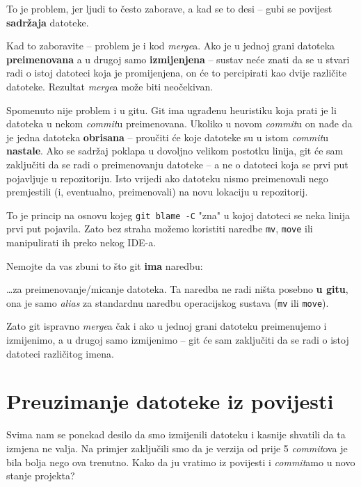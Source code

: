 To je problem, jer ljudi to često zaborave, a kad se to desi -- gubi se povijest \textbf{sadržaja} datoteke.

Kad to zaboravite -- problem je i kod \emph{merge}a.
Ako je u jednoj grani datoteka \textbf{preimenovana} a u drugoj samo \textbf{izmijenjena} -- sustav neće znati da se u stvari radi o istoj datoteci koja je promijenjena, on će to percipirati kao dvije različite datoteke.
Rezultat \emph{merge}a može biti neočekivan.

Spomenuto nije problem i u gitu.
Git ima ugrađenu heuristiku koja prati je li datoteka u nekom \emph{commit}u preimenovana.
Ukoliko u novom \emph{commit}u on nađe da je jedna datoteka \textbf{obrisana} -- proučiti će koje datoteke su u istom \emph{commit}u \textbf{nastale}. 
Ako se sadržaj poklapa u dovoljno velikom postotku linija, git će sam zaključiti da se radi o preimenovanju datoteke -- a ne o datoteci koja se prvi put pojavljuje u repozitoriju.
Isto vrijedi ako datoteku nismo preimenovali nego premjestili (i, eventualno, preimenovali) na novu lokaciju u repozitorij.

To je princip na osnovu kojeg \verb+git blame -C+ "zna" u kojoj datoteci se neka linija prvi put pojavila.
Zato bez straha možemo koristiti naredbe \verb+mv+, \verb+move+ ili manipulirati ih preko nekog IDE-a.

Nemojte da vas zbuni to što git \textbf{ima} naredbu:


\dots{}za preimenovanje/micanje datoteka.
Ta naredba ne radi ništa posebno \textbf{u gitu}, ona je samo \emph{alias} za standardnu naredbu operacijskog sustava (\verb+mv+ ili \verb+move+).

Zato git ispravno \emph{merge}a čak i ako u jednoj grani datoteku preimenujemo i izmijenimo, a u drugoj samo izmijenimo -- git će sam zaključiti da se radi o istoj datoteci različitog imena.

\section*{Preuzimanje datoteke iz povijesti}

Svima nam se ponekad desilo da smo izmijenili datoteku i kasnije shvatili da ta izmjena ne valja. 
Na primjer zaključili smo da je verzija od prije 5 \emph{commit}ova je bila bolja nego ova trenutno.
Kako da ju vratimo iz povijesti i \emph{commit}amo u novo stanje projekta?

